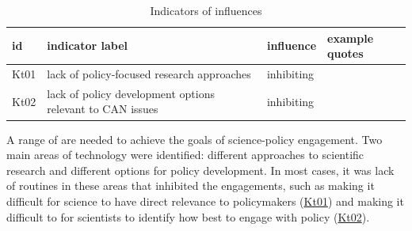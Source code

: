 \begin{table}[!ht]
\footnotesize
\caption{Indicators of \skitech{} influences}\label{tab:resskitech}
\begin{tabular}{L{.07\linewidth}L{.3\linewidth}L{.11\linewidth}L{.52\linewidth}} \hline
\textbf{id} & \textbf{indicator label} & \textbf{influence} & \textbf{example quotes} \\ \hline \hline 
Kt01 & lack of policy-focused research approaches & inhibiting &  \\
Kt02 & lack of policy development options relevant to CAN issues & inhibiting &  \\
\hline
\end{tabular}
\end{table}

A range of \skitech{} are needed to achieve the goals of science-policy engagement. Two main areas of technology were identified: different approaches to scientific research and different options for policy development. In most cases, it was lack of routines in these areas that inhibited the engagements, such as making it difficult for science to have direct relevance to policymakers (\hyperref[tab:resskitech]{Kt01}) and making it difficult to for scientists to identify how best to engage with policy (\hyperref[tab:resskitech]{Kt02}).

